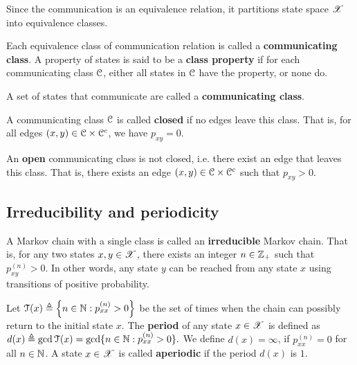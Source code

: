 \documentclass[letterpaper,10pt,english]{article}
\begin{document}
\begin{rem}
Since the communication is an equivalence relation, it partitions state space $\mathscr{X}$ into equivalence classes. 
\end{rem}
\begin{defn}
Each equivalence class of communication relation is called a \textbf{communicating class}. 
A property of states is said to be a \textbf{class property} if for each communicating class $\mathcal{C}$, 
either all states in $\mathcal{C}$ have the property, or none do. 
\end{defn}
\begin{defn}
A set of states that communicate are called a \textbf{communicating class}. 
\begin{compactenum}[(i)]
\item A communicating class $\mathcal{C}$ is called \textbf{closed} if no edges leave this class. 
That is, for all edges $(x,y) \in \mathcal{C} \times \mathcal{C}^c$, we have $p_{xy} = 0$. 
\item An \textbf{open} communicating class is not closed, i.e. there exist an edge that leaves this class. 
That is, there exists an edge $(x,y) \in \mathcal{C}\times \mathcal{C}^c$ such that $p_{xy} > 0$.  
\end{compactenum}
\end{defn}



\subsection{Irreducibility and periodicity}
\begin{defn} 
A Markov chain with a single class is called an \textbf{irreducible} Markov chain. 
That is, for any two states $x, y \in \mathscr{X}$, there exists an integer $n \in \mathbb{Z}_+$ such that $p_{xy}^{(n)} > 0$. 
In other words, any state $y$ can be reached from any state $x$ using transitions of positive probability. 
\end{defn}
\begin{defn}
Let $\mathcal{T}(x) \triangleq \left\{n \in \mathbb{N} : p_{xx}^{(n)} > 0\right\}$ be the set of times when the chain can possibly return to the initial state $x$. 
The \textbf{period} of any state $x \in \mathscr{X}$ is defined as
$
d(x) \triangleq \gcd\mathcal{T}(x) =  \gcd\{n \in \mathbb{N} : p_{xx}^{(n)} > 0\}.
$
We define $d(x) = \infty$, if $p_{xx}^{(n)} = 0$ for all $n \in \mathbb{N}$. 
A state $x \in \mathscr{X}$ is called \textbf{aperiodic} if the period $d(x)$ is $1$.  
\end{defn}
\end{document}
